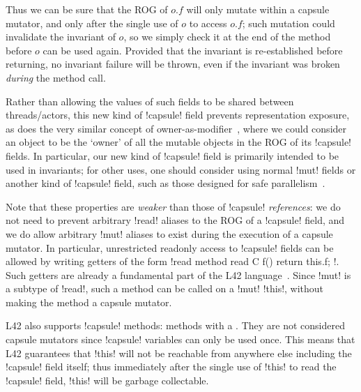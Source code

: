 Thus we can be sure that the ROG of $o.f$ will only mutate within a capsule mutator, and only after the single use of $o$ to access $o.f$; such mutation could invalidate the invariant of $o$, so we simply check it at the end of the method before $o$ can be used again. Provided that the invariant is re-established before returning, no invariant failure will be thrown, even if the invariant was broken \emph{during} the method call.

 
Rather than allowing the values of such fields to be shared between threads/actors, this new kind of \Q!capsule! field prevents representation exposure, as does the very similar concept of owner-as-modifier~\cite{Dietl05universes:lightweight,10.1007/978-3-540-92188-2_4}, where we could consider an object to be the `owner' of all the mutable objects in the ROG of its \Q!capsule! fields. In particular, our new kind of \Q!capsule! field is primarily intended to be used in invariants; for other uses, one should consider using normal \Q!mut! fields or another kind of \Q!capsule! field, such as those designed for safe parallelism~\cite{GordonEtAl12,clebsch2015deny,GIANNINI2019145}.

Note that these properties are \emph{weaker} than those of \Q!capsule! \emph{references}: we do not need to prevent arbitrary \Q!read! aliases to the ROG of a \Q!capsule! field, and we do allow arbitrary \Q!mut! aliases  to exist during the execution of a capsule mutator. In particular, unrestricted readonly access to \Q!capsule! fields can be allowed by writing getters of the form \Q!read method read C f() { return this.f; }!. Such getters are already a fundamental part of the L42 language~\cite{DBLP:journals/programming/AroraSO19}. Since \Q!mut! is a subtype of \Q!read!, such a method can be called on a \Q!mut! \Q!this!, without making the method a capsule mutator.

L42 also supports \Q!capsule! methods: methods with a \Q@capsule@ \Q@this@. They are not considered capsule mutators since \Q!capsule! variables can only be used once. This means that L42 guarantees that \Q!this! will not be reachable from anywhere else including the \Q!capsule! field itself; thus immediately after the single use of \Q!this! to read the \Q!capsule! field, \Q!this! will be garbage collectable.

